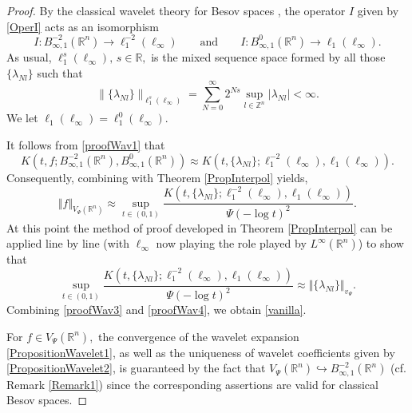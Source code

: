 \documentclass[11pt, a4paper,leqno]{amsart}
\theoremstyle{plain}
\numberwithin{equation}{section}
\theoremstyle{definition}
\theoremstyle{remark}
\def\R{\mathbb{R}}
\begin{document}
\begin{proof}
By the classical wavelet theory for Besov spaces \cite[Theorem 1.20]{Triebel}, the
operator $I$ given by \eqref{OperI} acts as an isomorphism
\begin{equation}
I:B_{\infty,1}^{-2}(\mathbb{R}^{n})\longrightarrow \ell^{-2}_1(\ell_\infty)%
\qquad\text{and}\qquad I:B_{\infty,1}^{0}(\mathbb{R}^{n})\longrightarrow \ell_1(\ell_\infty).\label{proofWav1}%
\end{equation}
As usual,  $\ell^s_1 (\ell_\infty), \, s \in \R,$ is the mixed sequence space formed by all those $\{\lambda_{N l}\}$ such that
$$
	\|\{\lambda_{N l}\}\|_{\ell^s_1 (\ell_\infty)} = \sum_{N=0}^\infty 2^{N s} \sup_{l \in \mathbb{Z}^n} |\lambda_{N l}| < \infty.
	$$
We let $\ell_1(\ell_\infty) = \ell_1^0 (\ell_\infty)$. 

It follows from \eqref{proofWav1} that
\[
K(t,f;B_{\infty,1}^{-2}(\mathbb{R}^{n}),B_{\infty,1}^{0}(\mathbb{R}%
^{n}))\approx K(t,\{\lambda_{N l}\};\ell^{-2}_1(\ell_\infty), \ell_1(\ell_\infty)).
\]
Consequently, combining with Theorem \ref{PropInterpol} yields,
\begin{equation}
\Vert f\Vert_{V_{\Psi}(\mathbb{R}^{n})}\approx\sup_{t\in(0,1)}\frac
{K(t,\{\lambda_{N l}\};\ell^{-2}_1(\ell_\infty), \ell_1(\ell_\infty))}{\Psi(-\log
t)^{2}}.\label{proofWav3}%
\end{equation}
At
this point the method of proof developed in Theorem \ref{PropInterpol} can be
applied line by line (with $\ell_{\infty}$ now playing the role played by
$L^{\infty}(\mathbb{R}^{n})$) to show that
\begin{equation}
\sup_{t\in(0,1)}\frac
{K(t,\{\lambda_{N l}\};\ell^{-2}_1(\ell_\infty), \ell_1(\ell_\infty))}{\Psi(-\log
t)^{2}}  \approx\Vert\{\lambda_{N l}\}\Vert_{v_{\Psi}%
}.\label{proofWav4}%
\end{equation}
Combining \eqref{proofWav3} and \eqref{proofWav4}, we obtain \eqref{vanilla}. 



For $f\in V_{\Psi}(\mathbb{R}^{n}),$ the convergence of the wavelet expansion
\eqref{PropositionWavelet1}, as well as the uniqueness of wavelet coefficients
given by \eqref{PropositionWavelet2}, is guaranteed by the fact that $V_{\Psi
}(\mathbb{R}^{n})\hookrightarrow B_{\infty,1}^{-2}(\mathbb{R}^{n})$ (cf.
Remark \ref{Remark1}) since the corresponding assertions are valid for
classical Besov spaces.
\end{proof}
\end{document}
